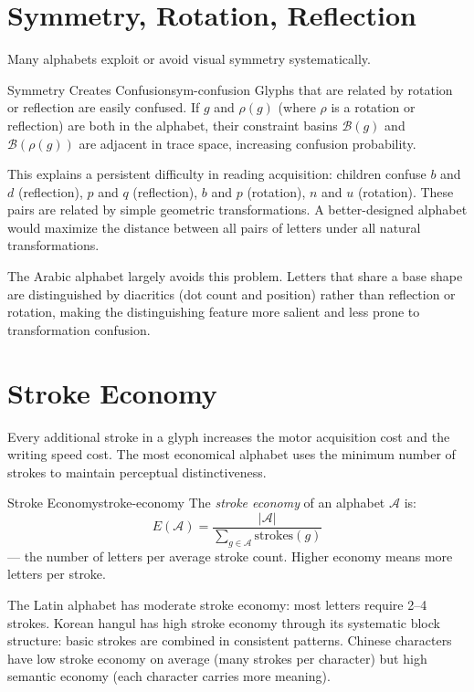 \section{Symmetry, Rotation, Reflection}

Many alphabets exploit or avoid visual symmetry systematically.

\begin{proposition}{Symmetry Creates Confusion}{sym-confusion}
  Glyphs that are related by rotation or reflection are easily confused.
  If $g$ and $\rho(g)$ (where $\rho$ is a rotation or reflection) are
  both in the alphabet, their constraint basins $\mathcal{B}(g)$ and
  $\mathcal{B}(\rho(g))$ are adjacent in trace space, increasing
  confusion probability.
\end{proposition}

This explains a persistent difficulty in reading acquisition: children
confuse $b$ and $d$ (reflection), $p$ and $q$ (reflection), $b$ and $p$
(rotation), $n$ and $u$ (rotation). These pairs are related by simple
geometric transformations. A better-designed alphabet would maximize the
distance between all pairs of letters under all natural transformations.

The Arabic alphabet largely avoids this problem. Letters that share a
base shape are distinguished by diacritics (dot count and position)
rather than reflection or rotation, making the distinguishing feature
more salient and less prone to transformation confusion.

\section{Stroke Economy}

Every additional stroke in a glyph increases the motor acquisition
cost and the writing speed cost. The most economical alphabet uses
the minimum number of strokes to maintain perceptual distinctiveness.

\begin{definition}{Stroke Economy}{stroke-economy}
  The \emph{stroke economy} of an alphabet $\mathcal{A}$ is:
  \[
    E(\mathcal{A}) = \frac{|\mathcal{A}|}{
      \sum_{g \in \mathcal{A}} \text{strokes}(g)}
  \]
  — the number of letters per average stroke count. Higher economy
  means more letters per stroke.
\end{definition}

The Latin alphabet has moderate stroke economy: most letters require
2--4 strokes. Korean hangul has high stroke economy through its
systematic block structure: basic strokes are combined in consistent
patterns. Chinese characters have low stroke economy on average
(many strokes per character) but high semantic economy (each character
carries more meaning).

